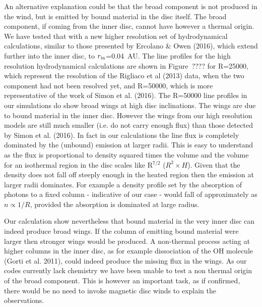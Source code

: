 \documentclass[10pt,fleqn,twoside]{article}
\begin{document}
An alternative explanation could be that the broad
component is not produced in the wind, but is emitted by bound
material in the disc itself. The broad component, if coming from the
inner disc, cannot have however a thermal origin. We have tested that
with a new higher resolution set of hydrodynamical calculations,
similar to those presented by Ercolano \& Owen (2016), which
extend further into the inner disc, to $r_{\rm in}$=0.04~AU. The line
profiles for the high resolution hydrodynamical calculations are shown
in Figure~???? for R=25000, which represent the resolution of the
Rigliaco et al (2013) data, when the two component had not been
resolved yet, and R=50000, which is more representative
of the work of Simon et al. (2016). The
R=50000 line profiles in our simulations do show broad wings at high disc
inclinations. The wings are due to bound material in the inner
disc. However the wings from our high resolution models are still much
smaller (i.e. do not carry enough flux) than those detected by
Simon et al. (2016). In fact in our calculations the line flux
is completely dominated by the (unbound) emission at larger
radii. This is easy to understand as the flux is proportional to
density squared times the volume and the volume for an isothermal
region in the disc scales like R$^{7/2}$ ($R^2\times H$). Given that
the density does not fall off steeply enough in the heated region then
the emission at larger radii dominates. For 
example a density profile set by the absorption of photons to a fixed
column - indicative of our case - would fall of approximately as
$n\propto1/R$, provided the absorption is dominated at large radius.

Our calculation show nevertheless that bound material in the very
inner disc can indeed produce broad wings. If the column of emitting
bound material were larger then stronger wings would be produced. A
non-thermal process acting at higher columns in the inner disc, as for
example dissociation of the OH molecule (Gorti et al. 2011), could
indeed produce the missing flux in the wings. As our codes currently
lack chemistry we have been unable to test a non thermal
origin of the broad component. This is however an important task, as
if confirmed, there would be no need to invoke magnetic disc winds to
explain the observations.  
\end{document}
